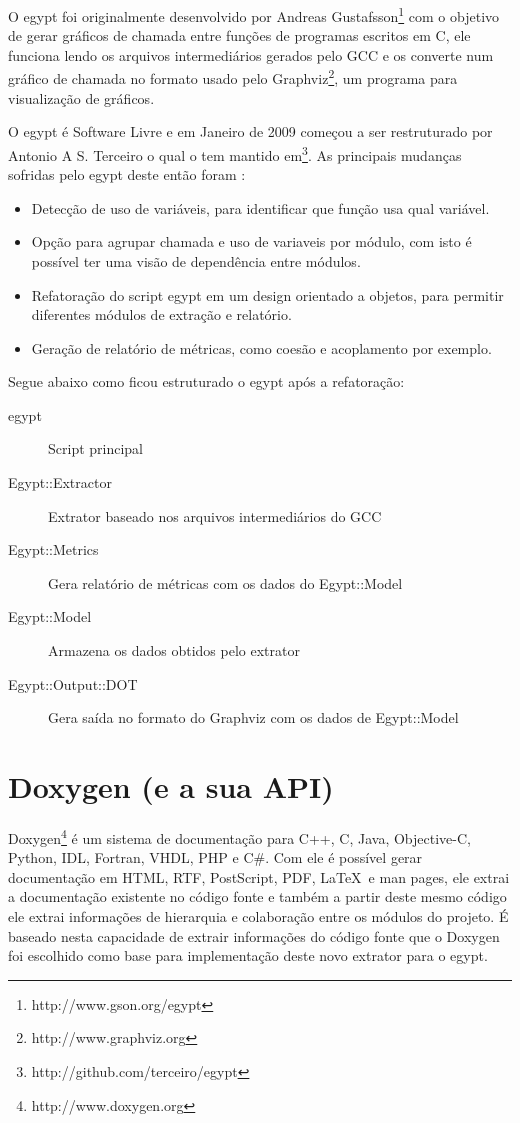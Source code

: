 O egypt foi originalmente desenvolvido por Andreas
Gustafsson\footnote{http://www.gson.org/egypt} com o objetivo de gerar gráficos
de chamada entre funções de programas escritos em C, ele funciona lendo os
arquivos intermediários gerados pelo GCC e os
converte num gráfico de chamada no formato usado pelo
Graphviz\footnote{http://www.graphviz.org}, um programa para visualização de
gráficos.

O egypt é Software Livre e em Janeiro de 2009 começou a ser restruturado por
Antonio A S. Terceiro o qual o tem mantido
em\footnote{http://github.com/terceiro/egypt}. As principais mudanças sofridas
pelo egypt deste então foram \cite{StructuralComplexityEvolution}:

\begin{itemize}
\item Detecção de uso de variáveis, para identificar que função usa qual
variável.
\item Opção para agrupar chamada e uso de variaveis por módulo, com isto é
possível ter uma visão de dependência entre módulos.
\item Refatoração do script egypt em um design orientado a objetos, para
permitir diferentes módulos de extração e relatório.
\item Geração de relatório de métricas, como coesão e acoplamento por exemplo.
\end{itemize}

Segue abaixo como ficou estruturado o egypt após a refatoração:

\begin{description}
\item[egypt] Script principal
\item[Egypt::Extractor] Extrator baseado nos arquivos intermediários do GCC
\item[Egypt::Metrics] Gera relatório de métricas com os dados do Egypt::Model
\item[Egypt::Model] Armazena os dados obtidos pelo extrator
\item[Egypt::Output::DOT] Gera saída no formato do Graphviz com os dados de Egypt::Model
\end{description}

\section{Doxygen (e a sua API)}

Doxygen\footnote{http://www.doxygen.org} é um sistema de documentação para C++,
C, Java, Objective-C, Python, IDL, Fortran, VHDL, PHP e C\#. Com ele é possível
gerar documentação em HTML, RTF, PostScript, PDF, \LaTeX\ e man pages, ele
extrai a documentação existente no código fonte e também a partir deste mesmo
código ele extrai informações de hierarquia e colaboração entre os módulos do
projeto. É baseado nesta capacidade de extrair informações do código fonte que
o Doxygen foi escolhido como base para implementação deste novo extrator para o
egypt.

